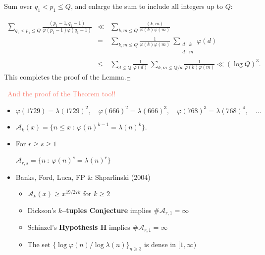 \documentclass[landscape]{powersem} %
\newcommand{\manorossa}{\textcolor{conceptcolor}{\ding{43}}}
\newcommand{\matitablu}{\textcolor{MidnightBlue}{\ding{46}}}
\newcommand{\heading}[1]{%
 \begin{center}
  \large\bf
  \shadowbox{{\textcolor{conceptcolor}{#1}}}%
 \end{center}
 \vspace{1ex minus 1ex}}
\begin{document}
\begin{slide}

Sum over $q_1<p_1\le Q$, and enlarge the sum to include all
integers up to $Q$:

\begin{eqnarray*}
\sum_{q_1<p_1\leq Q}
\frac{(p_1-1,q_1-1)}{\varphi(p_1-1)\varphi(q_1-1)}
&\ll&\sum_{k,m\leq Q}\frac{(k,m)}{\varphi(k) \varphi (m)}\\
&=&\sum_{k,m\leq Q}\frac1 {\varphi(k) \varphi (m)}
~\sum_{\substack{d\mid k\\ d\mid m}}\varphi(d)\\
&\le&\sum_{d\leq Q}\frac1 {\varphi(d)} \ \sum_{k,m\leq Q/d}\frac 1
{\varphi(k) \varphi (m)}\ll
         (\log Q)^3.
\end{eqnarray*}\pause
This completes the proof of the Lemma.$\hfill_\Box$\pause
\vfill

\ \hfill {\Large{\textcolor{Salmon}{And the proof of the Theorem too!!}}}

\end{slide}

\begin{slide}
\heading{Collision of powers of $\varphi$ and $\lambda$ (last topic)}\pause

\begin{itemize}
\item[\matitablu] $
\varphi(1729)=\lambda(1729)^2,
\quad\varphi(666)^2=\lambda(666)^3,
\quad\varphi(768)^3=\lambda(768)^4,
\quad\ldots
$\pause\medskip

\item[\matitablu] $
\mathcal A_k(x)=\{n\le x\ :\ \varphi(n)^{k-1}=\lambda(n)^k\}.
$\pause\medskip

\item[\matitablu] For $r\ge s\ge 1$

\centerline{$\mathcal A_{r,s}=\{n\ :\ \varphi(n)^s=\lambda(n)^r\}
$}\pause\medskip

\item[\matitablu] \textcolor{OliveGreen}{Banks, Ford, Luca, F\!\!P \& Shparlinski} (2004)
\pause\medskip
\begin{itemize}
\item[\manorossa] $\mathcal A_k(x)\geq x^{19/27k}$ for $k\geq2$\pause\medskip
\item[\manorossa] Dickson's \textbf{$k$--tuples Conjecture} implies $\#\mathcal A_{r,1}=\infty$\pause\medskip
\item[\manorossa] Schinzel's \textbf{Hypothesis H} implies $\#\mathcal A_{r,1}=\infty$\pause\medskip
\item[\manorossa] The set $\{\log\varphi(n)/\log\lambda(n)\}_{n \ge 3}$ is dense in
$[1,\infty)$
\end{itemize}
\end{itemize}

\end{slide}
\end{document}
